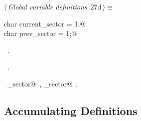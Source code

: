 \documentclass[a4paper]{report}
\begin{document}
\begin{flushleft} \small
\begin{minipage}{\linewidth}\label{scrap43}\raggedright\small
{} $\langle\,${\it Global variable definitions}\nobreak\ {\footnotesize {27d}}$\,\rangle\equiv$
\vspace{-1ex}
\begin{list}{}{} \item
\mbox{}\verb@unsigned char current_sector = 1;@\\
\mbox{}\verb@unsigned char prev_sector = 1;@\\
\mbox{}\verb@@{\NWsep}
\end{list}
\vspace{-1.5ex}
\footnotesize
\begin{list}{}{\setlength{\itemsep}{-\parsep}\setlength{\itemindent}{-\leftmargin}}
\item \NWtxtMacroDefBy\ .
\item \NWtxtMacroRefIn\ .
\item \NWtxtIdentsUsed\nobreak\  \verb@current_sector@\nobreak\ , \verb@prev_sector@\nobreak\ .
\item{}
\end{list}
\end{minipage}\vspace{4ex}
\end{flushleft}
\subsection{Accumulating Definitions}
\end{document}
